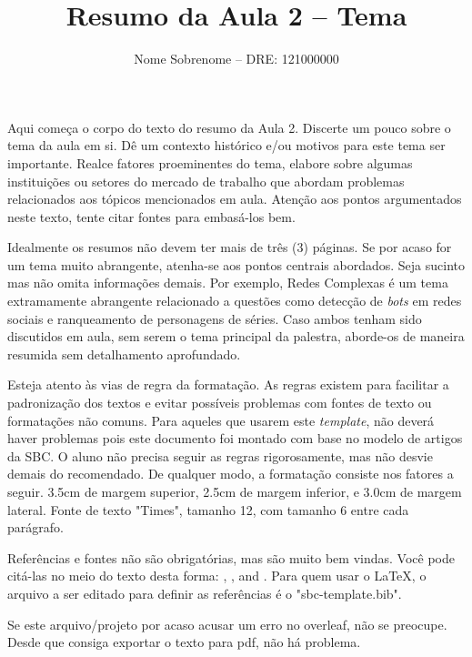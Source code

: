 \documentclass[12pt]{article}
\title{Resumo da Aula 2 -- Tema}
\author{Nome Sobrenome -- DRE: 121000000}
\begin{document}
 

\maketitle


Aqui começa o corpo do texto do resumo da Aula 2. Discerte um pouco sobre o tema da aula em si.
Dê um contexto histórico e/ou motivos para este tema ser importante. Realce fatores proeminentes do tema, elabore sobre algumas instituições ou setores do mercado de trabalho que abordam problemas relacionados aos tópicos mencionados em aula. Atenção aos pontos argumentados neste texto, tente citar fontes para embasá-los bem.

Idealmente os resumos não devem ter mais de três (3) páginas. Se por acaso for um tema muito abrangente, atenha-se aos pontos centrais abordados. Seja sucinto mas não omita informações demais. Por exemplo, Redes Complexas é um tema extramamente abrangente relacionado a questões como detecção de \emph{bots} em redes sociais e ranqueamento de personagens de séries. Caso ambos tenham sido discutidos em aula, sem serem o tema principal da palestra, aborde-os de maneira resumida sem detalhamento aprofundado.

Esteja atento às vias de regra da formatação. As regras existem para facilitar a padronização dos textos e evitar possíveis problemas com fontes de texto ou formatações não comuns. Para aqueles que usarem este \emph{template}, não deverá haver problemas pois este documento foi montado com base no modelo de artigos da SBC. O aluno não precisa seguir as regras rigorosamente, mas não desvie demais do recomendado. De qualquer modo, a formatação consiste nos fatores a seguir. 3.5cm de margem superior, 2.5cm de margem inferior, e 3.0cm de margem lateral. Fonte de texto "Times", tamanho 12, com tamanho 6 entre cada parágrafo.

Referências e fontes não são obrigatórias, mas são muito bem vindas. Você pode citá-las no meio do texto desta forma: \cite{knuth:84}, \cite{boulic:91}, and \cite{smith:99}. Para quem usar o LaTeX, o arquivo a ser editado para definir as referências é o "sbc-template.bib".

Se este arquivo/projeto por acaso acusar um erro no overleaf, não se preocupe. Desde que consiga exportar o texto para pdf, não há problema.




\end{document}
